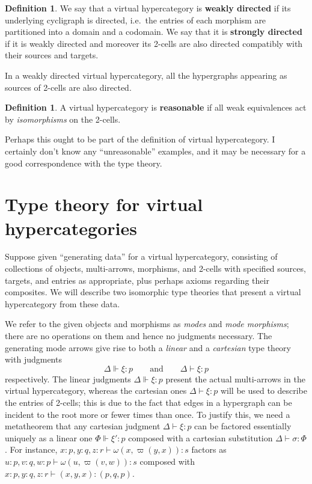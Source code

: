 \documentclass{article}
\theoremstyle{definition}
\newtheorem{defn}[thm]{Definition}
\theoremstyle{remark}
\let\types\vdash
\begin{document}
\begin{defn}
  We say that a virtual hypercategory is \textbf{weakly directed} if its underlying cycligraph is directed, i.e.\ the entries of each morphism are partitioned into a domain and a codomain.
  We say that it is \textbf{strongly directed} if it is weakly directed and moreover its 2-cells are also directed compatibly with their sources and targets.
\end{defn}

In a weakly directed virtual hypercategory, all the hypergraphs appearing as sources of 2-cells are also directed.

\begin{defn}
  A virtual hypercategory is \textbf{reasonable} if all weak equivalences act by \emph{isomorphisms} on the 2-cells.
\end{defn}

Perhaps this ought to be part of the definition of virtual hypercategory.
I certainly don't know any ``unreasonable'' examples, and it may be necessary for a good correspondence with the type theory.


\section{Type theory for virtual hypercategories}
\label{sec:type-theory}

Suppose given ``generating data'' for a virtual hypercategory, consisting of collections of objects, multi-arrows, morphisms, and 2-cells with specified sources, targets, and entries as appropriate, plus perhaps axioms regarding their composites.
We will describe two isomorphic type theories that present a virtual hypercategory from these data.

We refer to the given objects and morphisms as \emph{modes} and \emph{mode morphisms}; there are no operations on them and hence no judgments necessary.
The generating mode arrows give rise to both a \emph{linear} and a \emph{cartesian} type theory with judgments
\[ \Delta \Vdash \xi:p \qquad\text{and}\qquad \Delta \types \xi:p \]
respectively.
The linear judgments $\Delta \Vdash \xi:p$ present the actual multi-arrows in the virtual hypercategory, whereas the cartesian ones $\Delta \types \xi:p$ will be used to describe the entries of 2-cells; this is due to the fact that edges in a hypergraph can be incident to the root more or fewer times than once.
To justify this, we need a metatheorem that any cartesian judgment $\Delta \types \xi:p$ can be factored essentially uniquely as a linear one $\Phi \Vdash \xi':p$ composed with a cartesian substitution $\Delta \types \sigma : \Phi$.
For instance, $x:p, y:q, z:r \types \omega(x,\varpi(y,x)) : s$ factors as $u:p, v:q, w:p \types \omega(u,\varpi(v,w)):s$ composed with $x:p, y:q, z:r \types (x,y,x) : (p,q,p)$.
\end{document}
